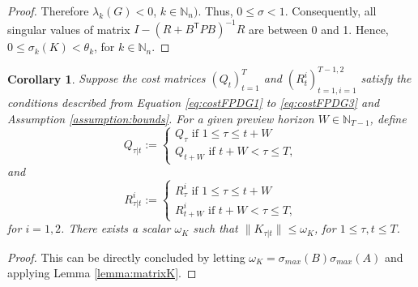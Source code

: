 \documentclass[letterpaper, 10 pt, conference]{ieeeconf}  %
\newcommand{\transpose}{\mathsf{T}}
\newtheorem{corollary}{Corollary}
\begin{document}
\begin{proof}
     Therefore $\lambda_{k}(G) < 0$, $k \in \mathbb{N}_{n})$. Thus, $0 \leq \sigma < 1$.
    Consequently, all singular values of matrix $I - (R+B^{\transpose}PB)^{-1}R$ are between 0 and 1. Hence,
        $0 \leq \sigma_{k}(K) < \theta_{k}$, for $k \in \mathbb{N}_{n}$.
\end{proof}

\begin{corollary}\label{corrolary:boundedK}
    Suppose the cost matrices $(Q_{t})_{t=1}^{T}$ and $(R_{t}^{i})_{t=1,i=1}^{T-1,2}$ satisfy the conditions described from Equation \eqref{eq:costFPDG1} to \eqref{eq:costFPDG3} and Assumption \ref{assumption:bounds}.
    For a given preview horizon $W\in \mathbb{N}_{T-1}$, define
    \begin{equation}
        Q_{\tau|t}:= 
        \begin{cases}
            Q_{\tau} \text{ if $1\leq \tau \leq t+W$}\\
            Q_{t+W} \text{ if $t+W < \tau \leq T$},
        \end{cases}
    \end{equation}
    and
    \begin{equation}
        R_{\tau|t}^{i}:= 
        \begin{cases}
            R_{\tau}^{i} \text{ if $1\leq \tau \leq t+W$}\\
            R_{t+W}^{i} \text{ if $t+W < \tau \leq T$},
        \end{cases}
    \end{equation}
    for $i = {1,2}$.
    There exists a scalar $\omega_{K}$ such that
        $\|K_{\tau|t}\| \leq \omega_{K}$,
    for $1\leq \tau,t\leq T$.
\end{corollary}

\begin{proof}
    This can be directly concluded by letting $\omega_{K} = \sigma_{max}(B)\sigma_{max}(A)$ and applying Lemma \ref{lemma:matrixK}.
\end{proof}
\end{document}
